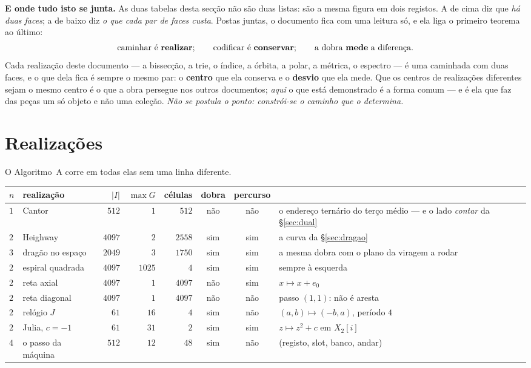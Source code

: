 \documentclass[11pt,a4paper]{article}
\newcommand{\abs}[1]{\lvert #1\rvert}
\newcommand{\Zc}{\ensuremath{X_2}}
\begin{document}
\medskip\noindent\textbf{E onde tudo isto se junta.} As duas tabelas desta
secção não são duas listas: são a mesma figura em dois registos. A de cima diz
que \emph{há duas faces}; a de baixo diz \emph{o que cada par de faces custa}.
Postas juntas, o documento fica com uma leitura só, e ela liga o primeiro
teorema ao último:
\[
\text{caminhar é \textbf{realizar}};\qquad
\text{codificar é \textbf{conservar}};\qquad
\text{a dobra \textbf{mede} a diferença.}
\]
Cada realização deste documento --- a bissecção, a trie, o índice, a órbita, a
polar, a métrica, o espectro --- é uma caminhada com duas faces, e o que dela
fica é sempre o mesmo par: o \textbf{centro} que ela conserva e o
\textbf{desvio} que ela mede. Que os centros de realizações diferentes sejam o
mesmo centro é o que a obra persegue nos outros documentos; \emph{aqui} o que
está demonstrado é a forma comum --- e é ela que faz das peças um só objeto e
não uma coleção. \emph{Não se postula o ponto: constrói-se o caminho que o
determina.}

\section{Realizações}\label{sec:realizacoes}

\noindent O Algoritmo~A corre em todas elas sem uma linha diferente.

\begin{center}\footnotesize
\begin{tabular}{@{}llrrrccp{}@{}}
\toprule
$n$ & realização & $\abs{I}$ & $\max G$ & células & dobra & percurso & \\
\midrule
$1$ & Cantor & $512$ & $1$ & $512$ & não & não & o endereço ternário do terço médio --- e o lado \emph{contar} da §\ref{sec:dual} \\
$2$ & Heighway & $4097$ & $2$ & $2558$ & sim & sim & a curva da §\ref{sec:dragao} \\
$3$ & dragão no espaço & $2049$ & $3$ & $1750$ & sim & sim & a mesma dobra com o plano da viragem a rodar \\
$2$ & espiral quadrada & $4097$ & $1025$ & $4$ & sim & sim & sempre à esquerda \\
$2$ & reta axial & $4097$ & $1$ & $4097$ & não & sim & $x\mapsto x+e_0$ \\
$2$ & reta diagonal & $4097$ & $1$ & $4097$ & não & não & passo $(1,1)$: não é aresta \\
$2$ & relógio $J$ & $61$ & $16$ & $4$ & sim & não & $(a,b)\mapsto(-b,a)$, período $4$ \\
$2$ & Julia, $c=-1$ & $61$ & $31$ & $2$ & sim & sim & $z\mapsto z^{2}+c$ em $\Zc[i]$ \\
$4$ & o passo da máquina & $512$ & $12$ & $48$ & sim & não & (registo, slot, banco, andar) \\
\bottomrule
\end{tabular}
\end{center}
\end{document}
